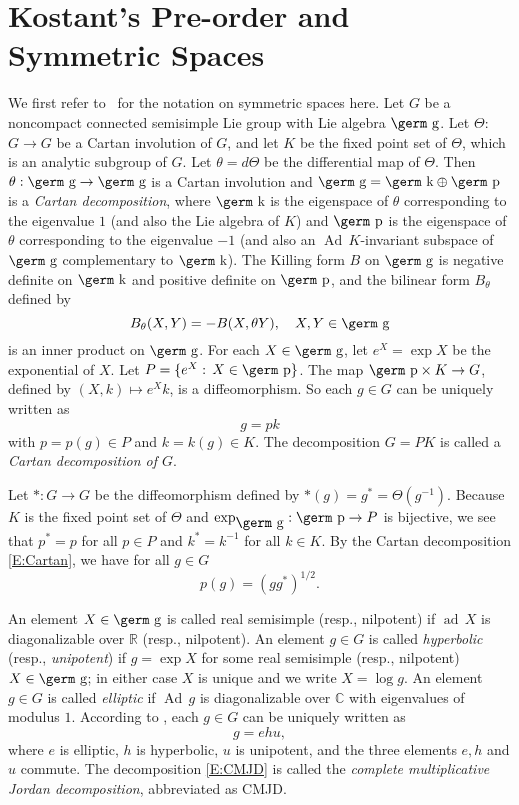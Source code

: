\documentclass[12pt, reqno]{amsart}
\numberwithin{equation}{section}
\theoremstyle{definition}
\def\g{\mbox{\germ g}}
\def\k{\mbox{\germ k}}
\def\p{\mbox{\germ p}}
\def\R{\mathbb R}
\def\C{\mathbb C}
\def\ad{{\operatorname{ad}\,}}
\def\Ad{{\operatorname{Ad}\,}}
\begin{document}
\section{Kostant's Pre-order and Symmetric Spaces}

We first refer to~\cite{He78, Kn02} for the notation on symmetric spaces here. Let $G$ be a noncompact connected semisimple Lie group with Lie algebra $\g$. 
Let $\Theta$: $G\to G$ be a Cartan involution of $G$, and let $K$ be the fixed point set of $\Theta$, which is an analytic subgroup of $G$. Let $\theta = d\Theta$ be the differential map of $\Theta$. Then $\theta: \g \to \g$ is a Cartan involution and $\g = \k \oplus \p$ is a \emph{Cartan decomposition}, where $\k$ is the eigenspace of $\theta$ corresponding to the eigenvalue $1$ (and also the Lie algebra of $K$) and $\p$ is the eigenspace of $\theta$ corresponding to the eigenvalue $-1$ (and also an $\Ad K$-invariant subspace of $\g$ complementary to $\k$). The  Killing form $B$ on $\g$ is negative definite on $\k$ and positive definite  on $\p$, and the bilinear form $B_\theta$ defined by 
\[
B_{\theta} (X, Y) = -B(X, \theta Y), \quad X, Y \in\g
\]
is an inner product on $\g$. 
For each $X \in \g$, let $e^X = \exp X$ be the exponential of $X$. Let $P = \{e^X: \, X\in\p\}$. The map $\p \times K \to G$, defined by $(X, k) \mapsto e^Xk$, is a diffeomorphism.
So each $g \in G$ can be uniquely written as 
\begin{equation} \label{E:Cartan}
g  = pk 
\end{equation}
with $p = p(g) \in P$ and $k = k(g) \in K$. The decomposition $G = PK$ is called a \emph{Cartan decomposition of $G$}.

Let $*: G \to G$ be the diffeomorphism defined by $*(g) = g^* = \Theta (g^{-1})$. 
Because $K$ is the fixed point set of $\Theta$ and $\exp_{\g}: \p \to P$ is bijective,  we see that $p^*= p$ for all $p\in P$ and $k^*=k^{-1}$ for all $k\in K$. 
By the Cartan decomposition \eqref{E:Cartan}, we have for all $g \in G$
\begin{equation} \label{E:p}
p(g) = (gg^*)^{1/2}.
\end{equation}

An element $X \in \g$ is called real semisimple (resp., nilpotent) if $\ad X$ is diagonalizable over $\R$ (resp., nilpotent). An element $g \in G$ is called {\it hyperbolic} (resp., {\it unipotent}) if $g = \exp X$ for some real semisimple (resp., nilpotent) $X \in \g$; in either case $X$ is unique and we write $X = \log g$. An element $g \in G$ is called {\it elliptic} if $\Ad g$ is diagonalizable over $\C$ with eigenvalues of modulus $1$. According to \cite[Proposition 2.1]{Ko73}, each $g \in G$ can be uniquely written as
\begin{equation} \label{E:CMJD}
g = ehu,
\end{equation}
where $e$ is elliptic, $h$ is hyperbolic,  $u$ is unipotent, and the three elements $e, h$ and $u$ commute.
The decomposition \eqref{E:CMJD} is called the {\it complete multiplicative Jordan decomposition}, abbreviated as CMJD.
\end{document}
